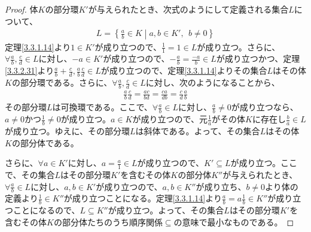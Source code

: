 \documentclass[dvipdfmx]{jsarticle}
\begin{document}
\begin{proof}
体$K$の部分環$K'$が与えられたとき、次式のようにして定義される集合$L$について、
\begin{align*}
L = \left\{ \frac{a}{b} \in K \middle| a,b \in K',\ \ b \neq 0 \right\}
\end{align*}
定理\ref{3.3.1.14}より$1 \in K'$が成り立つので、$\frac{1}{1} = 1 \in L$が成り立つ。さらに、$\forall\frac{a}{b},\frac{c}{d} \in L$に対し、$- a \in K'$が成り立つので、$- \frac{a}{b} = \frac{- a}{b} \in L$が成り立つかつ、定理\ref{3.3.2.31}より$\frac{a}{b} + \frac{c}{d},\frac{a}{b}\frac{c}{d} \in L$が成り立つので、定理\ref{3.3.1.14}よりその集合$L$はその体$K$の部分環である。さらに、$\forall\frac{a}{b},\frac{c}{d} \in L$に対し、次のようになることから、
\begin{align*}
\frac{a}{b}\frac{c}{d} = \frac{ac}{bd} = \frac{ca}{db} = \frac{c}{d}\frac{a}{b}
\end{align*}
その部分環$L$は可換環である。ここで、$\forall\frac{a}{b} \in L$に対し、$\frac{a}{b} \neq 0$が成り立つなら、$a \neq 0$かつ$\frac{1}{b} \neq 0$が成り立つ。$a \in K$が成り立つので、元$\frac{1}{a}$がその体$K$に存在し$\frac{b}{a} \in L$が成り立つ。ゆえに、その部分環$L$は斜体である。よって、その集合$L$はその体$K$の部分体である。\par
さらに、$\forall a \in K'$に対し、$a = \frac{a}{1} \in L$が成り立つので、$K' \subseteq L$が成り立つ。ここで、その集合$L$はその部分環$K'$を含むその体$K$の部分体$K''$が与えられたとき、$\forall\frac{a}{b} \in L$に対し、$a,b \in K'$が成り立つので、$a,b \in K''$が成り立ち、$b \neq 0$より体の定義より$\frac{1}{b} \in K''$が成り立つことになる。定理\ref{3.3.1.14}より$\frac{a}{b} = a\frac{1}{b} \in K''$が成り立つことになるので、$L \subseteq K''$が成り立つ。よって、その集合$L$はその部分環$K'$を含むその体$K$の部分体たちのうち順序関係$\subseteq$の意味で最小なものである。
\end{proof}
\end{document}
